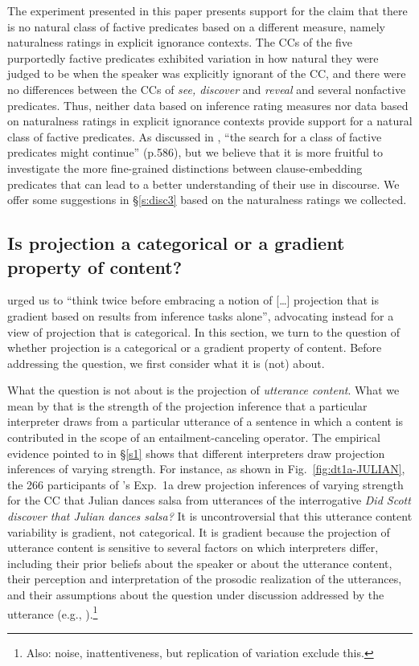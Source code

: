 \documentclass[11pt,fleqn]{article}
\newcommand{\6}{\mbox{$[\hspace*{-.6mm}[$}}
\newcommand{\9}{\mbox{$]\hspace*{-.6mm}]$}}
\newcommand{\citepos}[1]{\citeauthor{#1}'s \citeyear{#1}}
\begin{document}
The experiment presented in this paper presents support for the claim that there is no natural class of factive predicates based on a different measure, namely naturalness ratings in explicit ignorance contexts. The CCs of the five purportedly factive predicates exhibited variation in how natural they were judged to be when the speaker was explicitly ignorant of the CC, and there were no differences between the CCs of {\em see, discover} and {\em reveal} and several nonfactive predicates. Thus, neither data based on inference rating measures nor data based on naturalness ratings in explicit ignorance contexts provide support for a natural class of factive predicates. As discussed in \citealt{degen-tonhauser-language}, ``the search for a class of factive predicates might continue'' (p.586), but we believe that it is more fruitful to investigate the more fine-grained distinctions between clause-embedding predicates that can lead to a better understanding of their use in discourse. We offer some suggestions in \S\ref{s:disc3} based on the naturalness ratings we collected.


\subsection{Is projection a categorical or a gradient property of content?}

\citealt[497]{mandelkern-etal2020} urged us to ``think twice before embracing a notion of [\ldots] projection that is gradient based on results from inference tasks alone'', advocating instead for a view of projection that is categorical. In this section, we turn to the question of whether projection is a categorical or a gradient property of content. Before addressing the question, we first consider what it is (not) about.

What the question is not about is the projection of {\em utterance content}. What we mean by that is the strength of the projection inference that a particular interpreter draws from a particular utterance of a sentence in which a content is contributed in the scope of an entailment-canceling operator. The empirical evidence pointed to in \S\ref{s1} shows that different interpreters draw projection inferences of varying strength. For instance, as shown in Fig.~\ref{fig:dt1a-JULIAN}, the 266 participants of \citepos{degen-tonhauser-language} Exp.~1a drew projection inferences of varying strength for the CC that Julian dances salsa from utterances of the interrogative {\em Did Scott discover that Julian dances salsa?} It is uncontroversial that this utterance content variability is gradient, not categorical. It is gradient because the projection of utterance content is sensitive to several factors on which interpreters differ, including their prior beliefs about the speaker or about the utterance content, their perception and interpretation of the prosodic realization of the utterances, and their assumptions about the question under discussion addressed by the utterance (e.g., \citealt{djaerv-bacovcin2020,degen-tonhauser-openmind,mahler2020,mahler-thesis,tonhauser-salt26,tbd-variability,tonhauser-etal-sub23}).\footnote{Also: noise, inattentiveness, but replication of variation exclude this.} 
\end{document}

